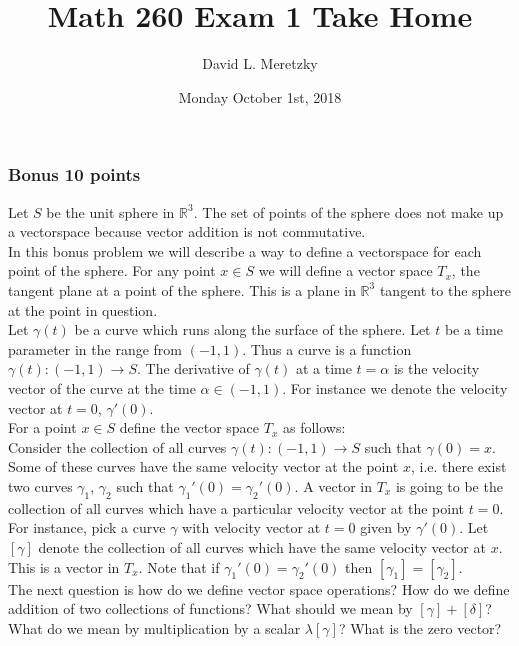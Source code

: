 \documentclass{article}
\title{ \vspace{-10ex} %
Math 260 Exam 1 Take Home
}
\author{David L. Meretzky
}
\date{%
Monday October 1st, 2018
}
\theoremstyle{problemstyle}
\theoremstyle{problemstyle}
\theoremstyle{problemstyle}
\begin{document}
\maketitle


\subsubsection*{\textbf{Bonus 10 points}}
Let $S$ be the unit sphere in $\mathbb{R}^3$. The set of points of the sphere does not make up a vectorspace because vector addition is not commutative.\\ 

In this bonus problem we will describe a way to define a vectorspace for each point of the sphere. For any point $x \in S$ we will define a vector space $T_x$, the tangent plane at a point of the sphere. This is a plane in $\mathbb{R}^3$ tangent to the sphere at the point in question.\\  

Let $\gamma(t)$ be a curve which runs along the surface of the sphere.  Let $t$ be a time parameter in the range from $(-1,1)$. Thus a curve is a function $\gamma(t):(-1,1) \rightarrow S$. The derivative of $\gamma(t)$ at a time $t=\alpha$ is the velocity vector of the curve at the time $\alpha \in (-1,1)$. For instance we denote the velocity vector at $t=0$, $\gamma'(0)$.\\

For a point $x\in S$ define the vector space $T_x$ as follows:\\

Consider the collection of all curves $\gamma(t):(-1,1) \rightarrow S$ such that $\gamma(0) = x$. Some of these curves have the same velocity vector at the point $x$, i.e. there exist two curves $\gamma_1$, $\gamma_2$ such that $\gamma_1'(0) = \gamma_2'(0)$. A vector in $T_x$ is going to be the collection of all curves which have a particular velocity vector at the point $t=0$. For instance, pick a curve $\gamma$ with velocity vector at $t=0$ given by $\gamma'(0)$. Let $[\gamma]$ denote the collection of all curves which have the same velocity vector at $x$. This is a vector in $T_x$.  Note that if $\gamma_1'(0) = \gamma_2'(0)$ then $[\gamma_1] = [\gamma_2]$.\\

The next question is how do we define vector space operations? How do we define addition of two collections of functions? What should we mean by $[\gamma]+[\delta]$? What do we mean by multiplication by a scalar $\lambda[\gamma]$? What is the zero vector?
\end{document}
